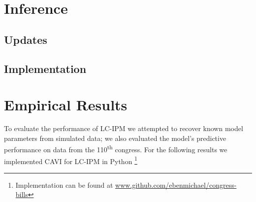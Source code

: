 \documentclass{article}
\begin{document}
\newpage

\section{Inference}
\label{inference}

\subsection{Updates}



\subsection{Implementation}

\newpage

\section{Empirical Results}
\label{results}
To evaluate the performance of LC-IPM we attempted to recover known model parameters from simulated data; we also evaluated the model's predictive performance on data from the 110\textsuperscript{th} congress. For the following results we implemented CAVI for LC-IPM in Python \footnote{Implementation can be found at \url{www.github.com/ebenmichael/congress-bills}}
\end{document}
